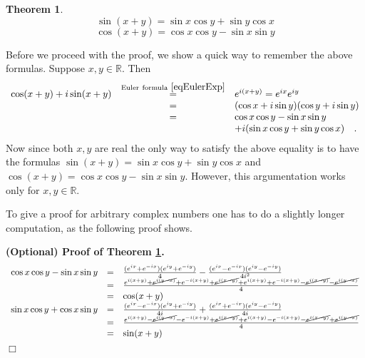\documentclass[12pt]{book}
\newenvironment{proofOptional}[1][]{ \noindent \textbf{(Optional) Proof#1.}}{$\Box$\medskip}
\newtheorem{theorem}{Theorem}[section]
\begin{document}
\begin{theorem}\label{thSinCosAngleSum}
\[
\sin(x+ y)=\sin x\cos y +\sin y\cos x  
\]
\[
\cos (x+y)= \cos x \cos y - \sin x \sin y
\]
\end{theorem}
Before we proceed with the proof, we show a quick way to remember the above formulas. Suppose $x,y\in \mathbb R$. Then
\[
\begin{array}{rcl}\cos (x+y) + i\sin (x+y)&\stackrel{\mathrm{Euler~formula~}\eqref{eqEulerExp}}{=}& e^{i(x+y)} =e^{ix}e^{iy}\\&=& (\cos x +i \sin y)(\cos y + i \sin y)\\&=& \cos x \cos y - \sin x \sin y\\&& +i(\sin x \cos y+ \sin y \cos x) \quad .\end{array}
\]
Now since both $x,y$ are real the only way to satisfy the above equality is to have the formulas $\sin(x+ y)=\sin x\cos y +\sin y\cos x  $ and $\cos (x+y)=\cos x \cos y - \sin x \sin y$. However, this argumentation works only for $x,y\in \mathbb R$. 

To give a proof for arbitrary complex numbers one has to do a slightly longer computation, as the following proof shows.

\begin{proofOptional}[ of Theorem \ref{thSinCosAngleSum}]
\[
\begin{array}{rcl}
\cos x \cos y - \sin x \sin y&=& \frac{(e^{ix}+e^{-ix})(e^{iy}+e^{-iy})}4 -\frac{(e^{ix}-e^{-ix})(e^{iy}-e^{-iy}) }{4i^2}\\
&=& \frac{ e^{i(x+y)}+ \cancel{e^{i(y-x)}}+{e^{-i(x+y)}} + \cancel{e^{i(x-y)}} +e^{i(x+y)}+e^{-i(x+y)}- \cancel{e^{i(x-y)}}-\cancel{e^{i(y-x)}} }4\\
&=& \cos(x+y)\\
\sin x \cos y + \cos x \sin y&=& \frac{(e^{ix}-e^{-ix})(e^{iy}+e^{-iy})}{4i} +\frac{(e^{ix}+e^{-ix})(e^{iy}-e^{-iy}) }{4i}\\
&=& \frac{ e^{i(x+y)}- \cancel{e^{i(y-x)}}-{e^{-i(x+y)}} + \cancel{e^{i(x-y)}} +e^{i(x+y)}-e^{-i(x+y)}- \cancel{e^{i(x-y)}}+\cancel{e^{i(y-x)}} }4\\
&=& \sin(x+y)

\end{array}
\]
\end{proofOptional}
\end{document}
